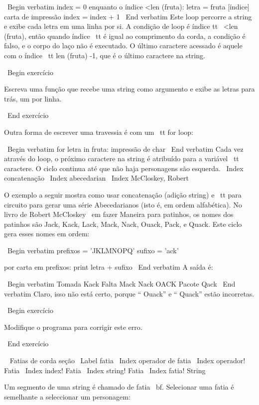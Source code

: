 \documentclass[10pt]{book}
\begin{document}
{{{{\ Begin {verbatim}
index = 0
enquanto o índice <len (fruta):
    letra = fruta [índice]
    carta de impressão
    index = index + 1
\ End {verbatim}
%
Este loop percorre a string e exibe cada letra em uma linha por
si. A condição de loop é {índice tt \ <len (fruta)}, então
quando {índice \ tt} é igual ao comprimento da corda, a
condição é falso, e o corpo do laço não é executado. O
último caractere acessado é aquele com o índice {\ tt len ​​(fruta) -1},
que é o último caractere na string.

\ Begin {} exercício

Escreva uma função que recebe uma string como argumento
e exibe as letras para trás, um por linha.

\ End {} exercício

Outra forma de escrever uma travessia é com um {\ tt for} loop:

\ Begin {verbatim}
for letra in fruta:
    impressão de char
\ End {verbatim}
%
Cada vez através do loop, o próximo caractere na string é atribuído
para a variável {\ tt caractere}. O ciclo continua até que não haja personagens são
esquerda.
\ Index {concatenação}
\ Index {} abecedarian
\ Index {McCloskey, Robert}

O exemplo a seguir mostra como usar concatenação (adição string)
e {\ tt} para circuito para gerar uma série Abecedarianos (isto é, em
ordem alfabética). No livro de Robert McCloskey {\ em fazer
Maneira para patinhos}, os nomes dos patinhos são Jack, Kack, Lack,
Mack, Nack, Ouack, Pack, e Quack. Este ciclo gera esses nomes em
ordem:

\ Begin {verbatim}
prefixos = 'JKLMNOPQ'
sufixo = 'ack'

por carta em prefixos:
    print letra + sufixo
\ End {verbatim}
%
A saída é:

\ Begin {verbatim}
Tomada
Kack
Falta
Mack
Nack
OACK
Pacote
Qack
\ End {verbatim}
%
Claro, isso não está certo, porque `` Ouack'' e
`` Quack'' estão incorretas.

\ Begin {} exercício

Modifique o programa para corrigir este erro.

\ End {} exercício



\ {} Fatias de corda seção
\ Label {fatia}
\ Index {operador de fatia}
\ Index {operador! Fatia}
\ Index {index! Fatia}
\ Index {string! Fatia}
\ Index {fatia! String}

Um segmento de uma string é chamado de fatia {\ bf}. Selecionar uma fatia é
semelhante a seleccionar um personagem:

}}}}
\end{document}

